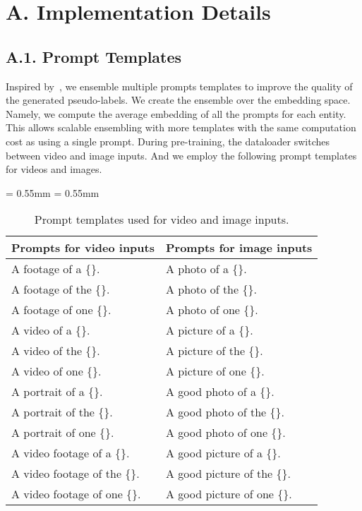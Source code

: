 \documentclass[10pt,twocolumn,letterpaper]{article}
\begin{document}
{\small


}

\section*{A. Implementation Details}

\subsection*{A.1. Prompt Templates}
Inspired by~\cite{radford2learning}, we ensemble multiple prompts templates to improve the quality of the generated pseudo-labels.
We create the ensemble over the embedding space. Namely, we compute the average embedding of all the prompts for each entity.
This allows scalable ensembling with more templates with the same computation cost as using a single prompt.
During pre-training, the dataloader switches between video and image inputs. And we employ the following prompt templates for videos and images.

\begin{table}[h]
\centering
\footnotesize
{
    \aboverulesep = 0.55mm
    \belowrulesep = 0.55mm
\centering	
\begin{tabular}	{l |l}
			\toprule
			\textbf{Prompts for video inputs} & \textbf{Prompts for image inputs}\\
\midrule
	A footage of a \{\}. & A photo of a \{\}.\\
	A footage of the \{\}. & A photo of the \{\}.\\
	A footage of one \{\}. &A photo of one \{\}.\\
	A video of a \{\}. & A picture of a \{\}.\\
	A video of the \{\}. &A picture of the \{\}. \\
	A video of one \{\}. & A picture of one \{\}.\\
	A portrait of a \{\}. & A good photo of a \{\}.\\
	A portrait of the \{\}. & A good photo of the \{\}.\\
	A portrait of one \{\}. & A good photo of one \{\}.\\
	A video footage of a \{\}. & A good picture of a \{\}. \\
	A video footage of the \{\}. &A good picture of the \{\}.\\
	A video footage of one \{\}. &A good picture of one \{\}.\\
			\bottomrule
		\end{tabular}}
\vspace{-5pt}
    \caption
	{Prompt templates used for video and image inputs.
	}
	\label{tbl:msvd-qa}
\vspace{-10pt}
\end{table}
\end{document}
